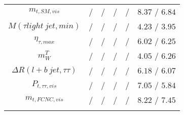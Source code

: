 \begin{tabular}{cccccc}
$m_{t,SM,vis}$ &  / &  / &  / &  / & $8.37$ / $6.84$\\
$M(\tau  light~jet,min)$ &  / &  / &  / &  / & $4.23$ / $3.95$\\
$\eta_{\tau ,max}$ &  / &  / &  / &  / & $6.02$ / $6.25$\\
$m^{T}_{W}$ &  / &  / &  / &  / & $4.05$ / $6.26$\\
$\Delta R(l+b~jet,\tau \tau )$ &  / &  / &  / &  / & $6.18$ / $6.07$\\
$P_{t,\tau \tau ,vis}$ &  / &  / &  / &  / & $7.05$ / $5.84$\\
$m_{t,FCNC,vis}$ &  / &  / &  / &  / & $8.22$ / $7.45$\\
\bottomrule\bottomrule\\
\end{tabular}
